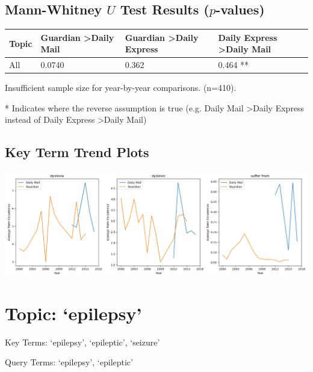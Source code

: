 \documentclass{report}
\begin{document}
\subsection{Mann-Whitney $U$ Test Results ($p$-values)}
\noindent
\begin{tabu} to 1.0\textwidth { | X[c] | X[c] | X[c] | X[c] | }  
	\hline
	Topic & Guardian \textgreater\space Daily Mail & Guardian \textgreater\space Daily Express & Daily Express \textgreater\space Daily Mail  \\
	\hline
	All & 0.0740 & 0.362 & 0.464 **  \\
	\hline
\end{tabu}

\noindent Insufficient sample size for year-by-year comparisons. (n=410).

\noindent ** Indicates where the reverse assumption is true (e.g. Daily Mail \textgreater\space Daily Express instead of Daily Express \textgreater\space Daily Mail)

\subsection{Key Term Trend Plots}
\includegraphics[width=\textwidth]{raw/dyslexia-terms.png}

\newpage
\section{Topic: `epilepsy'}
Key Terms: `epilepsy', `epileptic', `seizure'

\noindent Query Terms: `epilepsy', `epileptic'
\end{document}
